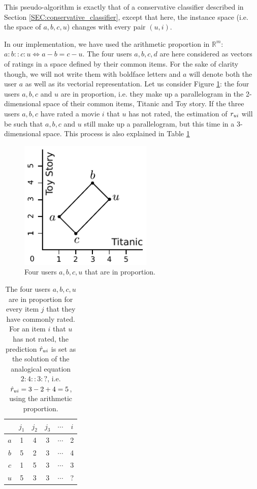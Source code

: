 This pseudo-algorithm is exactly that of a conservative classifier described in
Section \ref{SEC:conservative_classifier}, except that here, the instance space
(i.e. the space of $a, b, c, u$) changes with every pair $(u, i)$.

In our implementation, we have used the arithmetic proportion in
$\mathbb{R}^m$: $a:b::c:u \iff a - b = c - u$.  The four users $a, b, c, d$ are
here considered as vectors of ratings in a space defined by their common items.
For the sake of clarity though, we will not write them with boldface letters
and $a$ will denote both the user $a$ as well as its vectorial representation.
Let us consider Figure \ref{FIG:analogical_recommendation}: the four users $a,
b, c$ and $u$ are in proportion, i.e. they make up a parallelogram in the
2-dimensional space of their common items, Titanic and Toy story. If the
three users $a, b, c$ have rated a movie $i$ that $u$ has not rated, the
estimation of $r_{ui}$ will be such that $a, b, c$ and $u$ still make up a
parallelogram, but this time in a 3-dimensional space. This process is also
explained in Table \ref{TAB:analogical_recommendation}

\begin{figure}[!h]
\centering
  \includegraphics[width=2.5in]{figures/analogical_recommendation.pdf}
  \caption{Four users $a, b, c, u$ that are in proportion.}
\label{FIG:analogical_recommendation}
\end{figure}

\begin{table}[h!]
\centering
  \begin{tabular}{ c   c  c  c  c  c  }
\toprule
 & $j_1$ & $j_2$ & $j_3$ & $\cdots$ & $i$\\
  \midrule
$a$ & 1 & 4  & 3 & $\cdots$ & 2 \\
$b$ & 5 & 2  & 3 & $\cdots$ & 4 \\
$c$ & 1 & 5  & 3 & $\cdots$ & 3 \\
$u$ & 5 & 3  & 3 & $\cdots$ & ? \\
\bottomrule
\end{tabular}
\caption{The four users $a, b, c, u$ are in proportion for every item $j$ that
  they have commonly rated. For an item $i$ that $u$ has not rated, the
  prediction $\hat{r}_{ui}$ is set as the solution of the analogical equation
  $2:4::3:?$, i.e. $\hat{r}_{ui} = 3 - 2 + 4 = 5$, using the arithmetic proportion.}
\label{TAB:analogical_recommendation}
\end{table}

